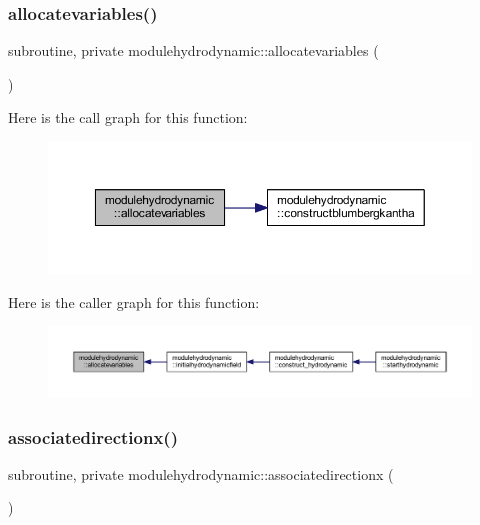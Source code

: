 \subsubsection{\texorpdfstring{allocatevariables()}{allocatevariables()}}
{\footnotesize\ttfamily subroutine, private modulehydrodynamic\+::allocatevariables (\begin{DoxyParamCaption}{ }\end{DoxyParamCaption})\hspace{0.3cm}{\ttfamily [private]}}

Here is the call graph for this function\+:\nopagebreak
\begin{figure}[H]
\begin{center}
\leavevmode
\includegraphics[width=350pt]{namespacemodulehydrodynamic_a0f6a249ae16b4abbfcead3fdc4641a89_cgraph}
\end{center}
\end{figure}
Here is the caller graph for this function\+:\nopagebreak
\begin{figure}[H]
\begin{center}
\leavevmode
\includegraphics[width=350pt]{namespacemodulehydrodynamic_a0f6a249ae16b4abbfcead3fdc4641a89_icgraph}
\end{center}
\end{figure}
\mbox{\label{namespacemodulehydrodynamic_a46e9869092f2ae2a7161f224fb8929e7}} 
\subsubsection{\texorpdfstring{associatedirectionx()}{associatedirectionx()}}
{\footnotesize\ttfamily subroutine, private modulehydrodynamic\+::associatedirectionx (\begin{DoxyParamCaption}{ }\end{DoxyParamCaption})\hspace{0.3cm}{\ttfamily [private]}}

